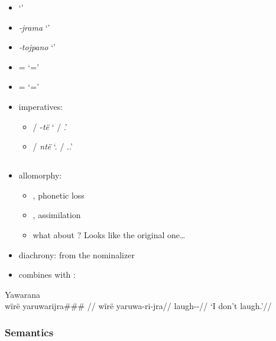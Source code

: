 \documentclass{memoir}
\begin{document}
\begin{itemize}
\item
   `'
\item
  \emph{‑jrama} `'
\item
  \emph{‑tojpano} `'
\item
  = `='
\item
  = `='
\item
  imperatives:

  \begin{itemize}
  \tightlist
  \item
     / ‑\emph{të} ` / .'
  \item
     / \emph{ntë} `. /
    ..'
  \end{itemize}
\end{itemize}

\subsection{\texorpdfstring{}{}}

\begin{itemize}
\tightlist
\item
  allomorphy:

  \begin{itemize}
  \tightlist
  \item
    , phonetic loss
  \item
    , assimilation
  \item
    what about ? Looks like the original one\ldots{}
  \end{itemize}
\item
  diachrony: from the nominalizer 
\item
  combines with :
\end{itemize}

\ex Yawarana \\
\label{convrisamaj-04}    \begingl
    \glpreamble  wïrë yaruwarijra\#\#\# //
    \gla wïrë yaruwa-ri-jra//
    \glb {} laugh--//
        \glft ‘I don’t laugh.’//  
    \endgl 
\xe

\subsubsection{Semantics}
\end{document}
